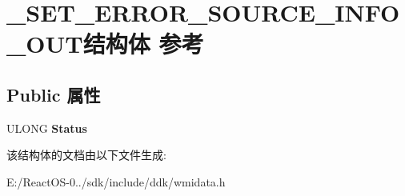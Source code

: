 \hypertarget{struct___s_e_t___e_r_r_o_r___s_o_u_r_c_e___i_n_f_o___o_u_t}{}\section{\+\_\+\+S\+E\+T\+\_\+\+E\+R\+R\+O\+R\+\_\+\+S\+O\+U\+R\+C\+E\+\_\+\+I\+N\+F\+O\+\_\+\+O\+U\+T结构体 参考}
\label{struct___s_e_t___e_r_r_o_r___s_o_u_r_c_e___i_n_f_o___o_u_t}
\subsection*{Public 属性}
\begin{DoxyCompactItemize}
\item 
\mbox{\label{struct___s_e_t___e_r_r_o_r___s_o_u_r_c_e___i_n_f_o___o_u_t_a977b01e05edafe864639590bf24aa0a3}} 
U\+L\+O\+NG {\bfseries Status}
\end{DoxyCompactItemize}


该结构体的文档由以下文件生成\+:\begin{DoxyCompactItemize}
\item 
E\+:/\+React\+O\+S-\/0../sdk/include/ddk/wmidata.\+h\end{DoxyCompactItemize}
